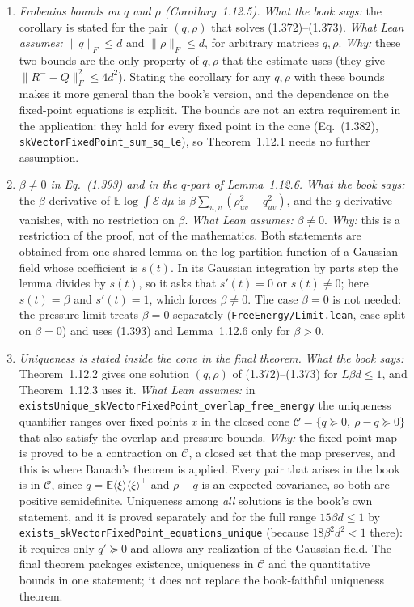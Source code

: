 \begin{remark}
\begin{enumerate}
\item \emph{Frobenius bounds on $q$ and $\rho$ (Corollary~1.12.5).}
\emph{What the book says:} the corollary is stated for the pair $(q,\rho)$ that solves (1.372)--(1.373).
\emph{What Lean assumes:} $\|q\|_F\le d$ and $\|\rho\|_F\le d$, for arbitrary matrices $q,\rho$.
\emph{Why:} these two bounds are the only property of $q,\rho$ that the estimate uses (they give
$\|R^{-}-Q\|_F^2\le4d^2$). Stating the corollary for any $q,\rho$ with these bounds makes it more general
than the book's version, and the dependence on the fixed-point equations is explicit.
The bounds are not an extra requirement in the application: they hold for every fixed point in the cone
(Eq.~(1.382), \texttt{skVectorFixedPoint\_sum\_sq\_le}), so Theorem~1.12.1 needs no further assumption.
\item \emph{$\beta\ne0$ in Eq.~(1.393) and in the $q$-part of Lemma~1.12.6.}
\emph{What the book says:} the $\beta$-derivative of $\mathbb E\log\int\mathcal E\,d\mu$ is
$\beta\sum_{u,v}(\rho_{uv}^2-q_{uv}^2)$, and the $q$-derivative vanishes, with no restriction on $\beta$.
\emph{What Lean assumes:} $\beta\ne0$.
\emph{Why:} this is a restriction of the proof, not of the mathematics. Both statements are obtained from one
shared lemma on the log-partition function of a Gaussian field whose coefficient is $s(t)$. In its Gaussian
integration by parts step the lemma divides by $s(t)$, so it asks that $s'(t)=0$ or $s(t)\ne0$; here
$s(t)=\beta$ and $s'(t)=1$, which forces $\beta\ne0$. The case $\beta=0$ is not needed: the pressure limit
treats $\beta=0$ separately (\texttt{FreeEnergy/Limit.lean}, case split on $\beta=0$) and uses (1.393) and
Lemma~1.12.6 only for $\beta>0$.
\item \emph{Uniqueness is stated inside the cone in the final theorem.}
\emph{What the book says:} Theorem~1.12.2 gives one solution $(q,\rho)$ of (1.372)--(1.373) for
$L\beta d\le1$, and Theorem~1.12.3 uses it.
\emph{What Lean assumes:} in \texttt{existsUnique\_skVectorFixedPoint\_overlap\_free\_energy} the uniqueness
quantifier ranges over fixed points $x$ in the closed cone $\mathcal C=\{q\succeq0,\ \rho-q\succeq0\}$
that also satisfy the overlap and pressure bounds.
\emph{Why:} the fixed-point map is proved to be a contraction on $\mathcal C$, a closed set that the map
preserves, and this is where Banach's theorem is applied. Every pair that arises in the book is in $\mathcal C$,
since $q=\mathbb E\langle\xi\rangle\langle\xi\rangle^{\!\top}$ and $\rho-q$ is an expected covariance, so both
are positive semidefinite. Uniqueness among \emph{all} solutions is the book's own statement, and it is proved
separately and for the full range $15\beta d\le1$ by \texttt{exists\_skVectorFixedPoint\_equations\_unique}
(because $18\beta^2d^2<1$ there): it requires only $q'\succeq0$ and allows any realization of the Gaussian
field. The final theorem packages existence, uniqueness in $\mathcal C$ and the quantitative bounds in one
statement; it does not replace the book-faithful uniqueness theorem.
\end{enumerate}
\end{remark}

